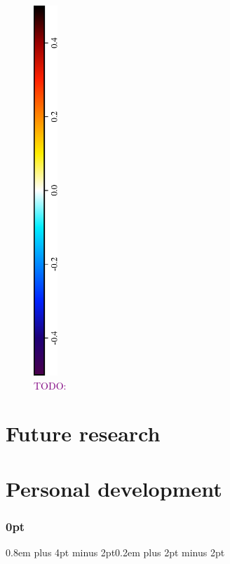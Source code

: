 \documentclass[a4paper,11pt]{article}
\newcommand{\TODO}[1]{\textcolor{purple}{TODO: \emph{#1}}}
\begin{document}
\begin{figure}
\includegraphics[height=5.5in,angle=270]{theta-diff-legend.eps}
\caption{\TODO{}}
\label{fig:cp-results}
\end{figure}

\section{Future research}


\section{Personal development}


                                                 


\newpage

\titlespacing\subsubsection{0pt}{0.8em plus 4pt minus 2pt}{0.2em plus 2pt minus 2pt}
\end{document}
